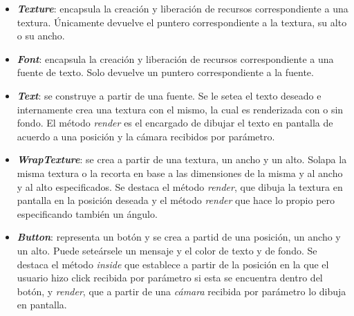 \begin{itemize}
	\item \textbf{\textit{Texture}}: encapsula la creación y liberación de recursos correspondiente a una textura. Únicamente devuelve el puntero correspondiente a la textura, su alto o su ancho.
	
	\item \textbf{\textit{Font}}: encapsula la creación y liberación de recursos correspondiente a una fuente de texto. Solo devuelve un puntero correspondiente a la fuente.
	
	\item \textbf{\textit{Text}}: se construye a partir de una fuente. Se le setea el texto deseado e internamente crea una textura con el mismo, la cual es renderizada con o sin fondo. El método \textit{render} es el encargado de dibujar el texto en pantalla de acuerdo a una posición y la cámara recibidos por parámetro.

	\item \textbf{\textit{WrapTexture}}: se crea a partir de una textura, un ancho y un alto. Solapa la misma textura o la recorta en base a las dimensiones de la misma y al ancho y al alto especificados. Se destaca el método \textit{render}, que dibuja la textura en pantalla en la posición deseada y el método \textit{render} que hace lo propio pero especificando también un ángulo.
	
	\item \textbf{\textit{Button}}: representa un botón y se crea a partid de una posición, un ancho y un alto. Puede seteársele un mensaje y el color de texto y de fondo. Se destaca el método \textit{inside} que establece a partir de la posición en la que el usuario hizo click recibida por parámetro si esta se encuentra dentro del botón, y \textit{render}, que a partir de una \textit{cámara} recibida por parámetro lo dibuja en pantalla.
	

\end{itemize}
